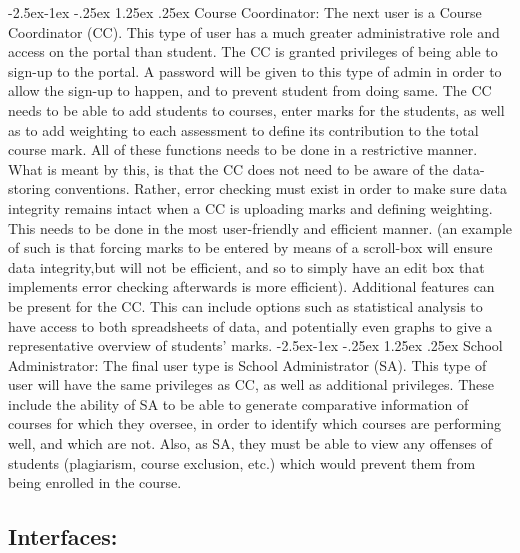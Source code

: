 \documentclass[paper=a4, fontsize=11pt]{scrartcl}
\makeatletter
\numberwithin{equation}{section}		%
\numberwithin{figure}{section}			%
\numberwithin{table}{section}				%
\renewcommand\paragraph{\@startsection{paragraph}{4}{\z@}%
            {-2.5ex\@plus -1ex \@minus -.25ex}%
            {1.25ex \@plus .25ex}%
            {\normalfont\normalsize\bfseries}}
\makeatother
\begin{document}
\paragraph{Course Coordinator:} The next user is a Course Coordinator (CC). This type of user has a
much greater administrative role and access on the portal than student.
The CC is granted privileges of being able to sign-up to the portal. A
password will be given to this type of admin in order to allow the sign-up
to happen, and to prevent student from doing same. The CC needs to be
able to add students to courses, enter marks for the students, as well as
to add weighting to each assessment to define its contribution to the total
course mark. All of these functions needs to be done in a restrictive
manner. What is meant by this, is that the CC does not need to be aware
of the data-storing conventions. Rather, error checking must exist in
order to make sure data integrity remains intact when a CC is uploading
marks and defining weighting. This needs to be done in the most
user-friendly and efficient manner. (an example of such is that forcing
marks to be entered by means of a scroll-box will ensure data integrity,but will not be efficient, and so to simply have an edit box that
implements error checking afterwards is more efficient). Additional
features can be present for the CC. This can include options such as
statistical analysis to have access to both spreadsheets of data, and
potentially even graphs to give a representative overview of students’
marks.
\paragraph{School Administrator: } The final user type is School Administrator (SA). This type of user will have the same privileges as CC, as well as additional privileges. These
include the ability of SA to be able to generate comparative information of
courses for which they oversee, in order to identify which courses are
performing well, and which are not. Also, as SA, they must be able to
view any offenses of students (plagiarism, course exclusion, etc.) which
would prevent them from being enrolled in the course. 
\\
\subsection{Interfaces:}
\end{document}
